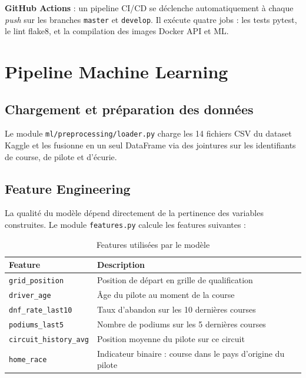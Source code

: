 \documentclass[12pt, a4paper]{article}
\begin{document}
\textbf{GitHub Actions} : un pipeline CI/CD se déclenche automatiquement à chaque \textit{push} sur les branches \texttt{master} et \texttt{develop}. Il exécute quatre jobs : les tests pytest, le lint flake8, et la compilation des images Docker API et ML.

\section{Pipeline Machine Learning}

\subsection{Chargement et préparation des données}

Le module \texttt{ml/preprocessing/loader.py} charge les 14 fichiers CSV du dataset Kaggle et les fusionne en un seul DataFrame via des jointures sur les identifiants de course, de pilote et d'écurie.

\subsection{Feature Engineering}

La qualité du modèle dépend directement de la pertinence des variables construites. Le module \texttt{features.py} calcule les features suivantes :

\begin{table}[H]
\centering
\begin{tabularx}{\textwidth}{lX}
\toprule
\textbf{Feature} & \textbf{Description} \\
\midrule
\texttt{grid\_position}          & Position de départ en grille de qualification \\
\texttt{driver\_age}             & Âge du pilote au moment de la course \\
\texttt{dnf\_rate\_last10}       & Taux d'abandon sur les 10 dernières courses \\
\texttt{podiums\_last5}          & Nombre de podiums sur les 5 dernières courses \\
\texttt{circuit\_history\_avg}   & Position moyenne du pilote sur ce circuit \\
\texttt{home\_race}              & Indicateur binaire : course dans le pays d'origine du pilote \\
\bottomrule
\end{tabularx}
\caption{Features utilisées par le modèle}
\end{table}
\end{document}

